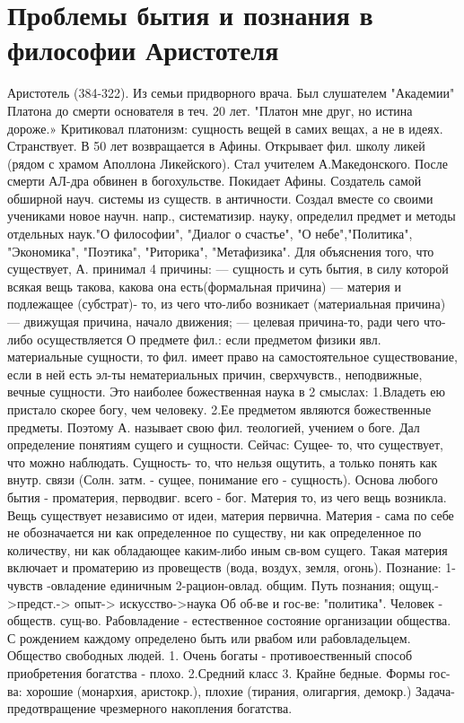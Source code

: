 \documentclass[12pt]{article}
\begin{document}
\newpage
\section{Проблемы бытия и познания в философии Аристотеля}
Аристотель (384-322). Из семьи придворного врача. Был слушателем "Академии" Платона до смерти основателя
в теч. 20 лет. "Платон мне друг, но истина дороже.» Критиковал платонизм: сущность вещей в самих вещах, а не
в идеях. Странствует. В 50 лет возвращается в Афины. Открывает фил. школу ликей (рядом с храмом Аполлона
Ликейского). Стал учителем А.Македонского. После смерти АЛ-дра обвинен в богохульстве. Покидает Афины.
Создатель самой обширной науч. системы из существ. в античности. Создал вместе со своими учениками новое
научн. напр., систематизир. науку, определил предмет и методы отдельных наук."О философии", "Диалог о
счастье", "О небе","Политика", "Экономика", "Поэтика", "Риторика", "Метафизика". 
Для объяснения того, что существует, А. принимал 4 причины:
— сущность и суть бытия, в силу которой всякая вещь такова, какова она есть(формальная причина)
— материя и подлежащее (субстрат)- то, из чего что-либо возникает (материальная причина)
— движущая причина, начало движения;
— целевая причина-то, ради чего что-либо осуществляется
О предмете фил.: если предметом физики явл. материальные сущности, то фил. имеет право на самостоятельное
существование, если в ней есть эл-ты нематериальных причин, сверхчувств., неподвижные, вечные сущности. 
Это наиболее божественная наука в 2 смыслах: 
1.Владеть ею пристало скорее богу, чем человеку. 
2.Ее предметом являются божественные предметы. 
Поэтому А. называет свою фил. теологией, учением о боге. Дал определение понятиям сущего и сущности.
Сейчас: Сущее- то, что существует, что можно наблюдать. Сущность- то, что нельзя ощутить, а только понять
как внутр. связи (Солн. затм. - сущее, понимание его - сущность). Основа любого бытия - проматерия,
перводвиг. всего - бог. Материя то, из чего вещь возникла. Вещь существует независимо от идеи, материя
первична. Материя - сама по себе не обозначается ни как определенное по существу, ни как определенное по
количеству, ни как обладающее каким-либо иным св-вом сущего. Такая материя включает и проматерию из
провеществ (вода, воздух, земля, огонь).
Познание: 1-чувств -овладение единичным 2-рацион-овлад. общим. 
Путь познания; ощущ.->предст.-> опыт-> искусство->наука
Об об-ве и гос-ве: "политика". Человек - обществ. сущ-во. Рабовладение - естественное состояние организации
общества. С рождением каждому определено быть или рвабом или рабовладельцем.
Общество свободных людей. 
1. Очень богаты - противоественный способ приобретения богатства - плохо. 
2.Средний класс 
3. Крайне бедные. 
Формы гос-ва: хорошие (монархия, аристокр.), плохие (тирания, олигаргия, демокр.) Задача- предотвращение
чрезмерного накопления богатства.
\end{document}
